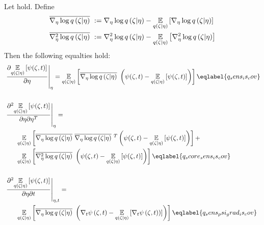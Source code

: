 \begin{lem}
%
Let  hold.  Define
%
\begin{align*}
%
\lqgradbar{\zeta \vert \eta} :={}& \lqgrad{\zeta \vert \eta}
  - \expect{\q(\zeta \vert \eta)}{\lqgrad{\zeta \vert \eta}} \\
\lqhessbar{\zeta \vert \eta} :={}& \lqhess{\zeta \vert \eta}
 - \expect{\q(\zeta \vert \eta)}{\lqhess{\zeta \vert \eta}} \\
%
\end{align*}
%
Then the following equalties hold:
%
\begin{align}
%
\MoveEqLeft
\fracat{\partial \expect{\q(\zeta \vert \eta)}
              {\psi(\zeta, \t)}}{\partial \eta}{\eta} ={}
\expect{\q(\zeta \vert \eta)}
       {\lqgradbar{\zeta \vert \eta} \left(
        \psi(\zeta,\t) - \expect{\q(\zeta \vert \eta)}{\psi(\zeta, \t)}
       \right)
       }\eqlabel{q_sens_is_cov}\\\nonumber\\
%
\MoveEqLeft
\fracat{\partial^2 \expect{\q(\zeta \vert \eta)}
      {\psi(\zeta, \t)}}{\partial \eta \partial \eta^T}{\eta} ={}
\nonumber\\&
\expect{\q(\zeta \vert \eta)}
       {\lqgradbar{\zeta \vert \eta} \lqgradbar{\zeta \vert \eta}^T
       \left(
        \psi(\zeta,\t) - \expect{\q(\zeta \vert \eta)}{\psi(\zeta, \t)}
       \right)
       } +
\nonumber\\ &
\expect{\q(\zeta \vert \eta)}{
       \lqhessbar{\zeta \vert \eta}
       \left(
        \psi(\zeta,\t) - \expect{\q(\zeta \vert \eta)}{\psi(\zeta, \t)}
       \right)
       } \eqlabel{q_score_sens_is_cov}\\\nonumber\\
%
\MoveEqLeft
\fracat{\partial^2 \expect{\q(\zeta \vert \eta)}
      {\psi(\zeta, \t)}}{\partial \eta \partial \t}{\eta, \t} ={}\nonumber\\&
  \expect{\q(\zeta \vert \eta)}
         {\lqgradbar{\zeta \vert \eta} \left(
          \psigrad{\zeta,\t} - \expect{\q(\zeta \vert \eta)}{\psigrad{\zeta, \t})}
         \right)
         }\eqlabel{q_sens_psi_grad_is_cov}
%
\end{align}
%
\end{lem}


